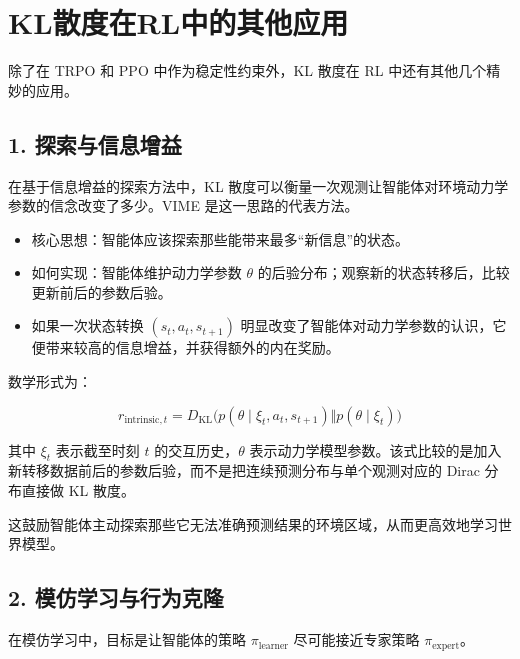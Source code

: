 \clearpage

\hypertarget{klux6563ux5ea6ux5728rlux4e2dux7684ux5176ux4ed6ux5e94ux7528}{%
\section{KL散度在RL中的其他应用}\label{klux6563ux5ea6ux5728rlux4e2dux7684ux5176ux4ed6ux5e94ux7528}}

除了在 TRPO 和 PPO 中作为稳定性约束外，KL 散度在 RL 中还有其他几个精妙的应用。

\hypertarget{ux63a2ux7d22ux4e0eux4fe1ux606fux589eux76ca}{%
\subsection{1. 探索与信息增益}\label{ux63a2ux7d22ux4e0eux4fe1ux606fux589eux76ca}}

在基于信息增益的探索方法中，KL 散度可以衡量一次观测让智能体对环境动力学参数的信念改变了多少。VIME 是这一思路的代表方法。

\begin{itemize}
\tightlist
\item
  核心思想：智能体应该探索那些能带来最多``新信息''的状态。
\item
  如何实现：智能体维护动力学参数 \(\theta\) 的后验分布；观察新的状态转移后，比较更新前后的参数后验。
\item
  如果一次状态转换 \((s_t,a_t,s_{t+1})\) 明显改变了智能体对动力学参数的认识，它便带来较高的信息增益，并获得额外的内在奖励。
\end{itemize}

数学形式为：

\[
r_{\mathrm{intrinsic},t}
=
D_{\mathrm{KL}}\bigl(
p(\theta\mid \xi_t,a_t,s_{t+1})
\Vert
p(\theta\mid \xi_t)
\bigr)
\]

其中 \(\xi_t\) 表示截至时刻 \(t\) 的交互历史，\(\theta\) 表示动力学模型参数。该式比较的是加入新转移数据前后的参数后验，而不是把连续预测分布与单个观测对应的 Dirac 分布直接做 KL 散度。

这鼓励智能体主动探索那些它无法准确预测结果的环境区域，从而更高效地学习世界模型。

\hypertarget{ux6a21ux4effux5b66ux4e60ux4e0eux884cux4e3aux514bux9686}{%
\subsection{2. 模仿学习与行为克隆}\label{ux6a21ux4effux5b66ux4e60ux4e0eux884cux4e3aux514bux9686}}

在模仿学习中，目标是让智能体的策略 \(\pi_{\mathrm{learner}}\) 尽可能接近专家策略 \(\pi_{\mathrm{expert}}\)。

